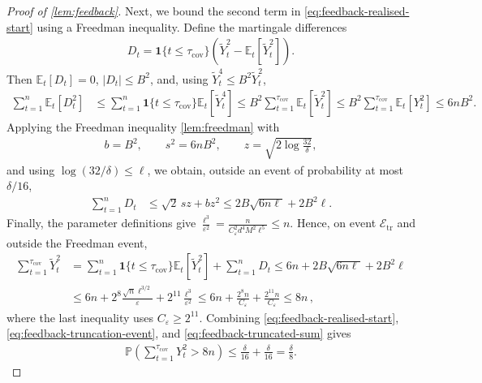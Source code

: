 \documentclass[11pt]{article}
\newcommand{\E}{\mathbb E}
\newcommand{\Pp}{\mathbb P}
\newcommand{\1}{\mathbf 1}
\newcommand{\eps}{\varepsilon}
\begin{document}
\begin{proof}[Proof of \cref{lem:feedback}]
    Next, we bound the second term in \eqref{eq:feedback-realised-start} using a Freedman inequality.
    Define the martingale differences
    \begin{align}
        D_t
        =
        \1\{t\leq\tau_{\mathrm{cov}}\}
        \left(
        \widetilde Y_t^2
        -
        \E_t[\widetilde Y_t^2]
        \right).
    \end{align}
    Then
    $\E_t[D_t]
        =0$,
    $|D_t|\leq B^2$,
    and, using $\widetilde Y_t^4\leq B^2\widetilde Y_t^2$,
    \begin{align}
        \sum_{t=1}^n\E_t[D_t^2]
         & \leq
        \sum_{t=1}^n
        \1\{t\leq\tau_{\mathrm{cov}}\}
        \E_t[\widetilde Y_t^4]
        \leq
        B^2
        \sum_{t=1}^{\tau_{\mathrm{cov}}}
        \E_t[\widetilde Y_t^2]
        \leq
        B^2
        \sum_{t=1}^{\tau_{\mathrm{cov}}}
        \E_t[Y_t^2]
        \leq
        6nB^2.
        \label{eq:feedback-freedman-variance}
    \end{align}
    Applying the Freedman inequality \cref{lem:freedman} with
    \begin{align}
        b=B^2,
        \qquad
        s^2=6nB^2,
        \qquad
        z=\sqrt{2\log\frac{32}{\delta}},
    \end{align}
    and using $\log(32/\delta)\leq\ell$, we obtain, outside an event of
    probability at most $\delta/16$,
    \begin{align}
        \sum_{t=1}^nD_t
         & \leq
        \sqrt2\,s z+bz^2
        \leq
        2B\sqrt{6n\ell}
        +
        2B^2\ell.
        \label{eq:feedback-freedman}
    \end{align}
    Finally, the parameter definitions give
    $\frac{\ell^3}{\eps^2}
        =
        \frac{
            n
        }{
            C_\eps^2d^4M^2\ell^5
        }
        \leq n$.
    Hence, on event $\mathcal E_{\mathrm{tr}}$ and outside the Freedman event,
    \begin{align}
        \sum_{t=1}^{\tau_{\mathrm{cov}}}
        \widetilde Y_t^2
         & =
        \sum_{t=1}^n
        \1\{t\leq\tau_{\mathrm{cov}}\}
        \E_t[\widetilde Y_t^2]
        +
        \sum_{t=1}^nD_t
        \leq
        6n
        +
        2B\sqrt{6n\ell}
        +
        2B^2\ell
        \\
         &
        \leq
        6n
        +
        2^8\frac{\sqrt n \ell^{3/2}}{\eps}
        +
        2^{11}\frac{\ell^3}{\eps^2}
        \leq
        6n
        +
        \frac{2^8n}{C_\eps}
        +
        \frac{2^{11}n}{C_\eps}
        \leq
        8n\,,
        \label{eq:feedback-truncated-sum}
    \end{align}
    where the last inequality uses $C_\eps\geq2^{11}$.
    Combining
    \eqref{eq:feedback-realised-start},
    \eqref{eq:feedback-truncation-event}, and
    \eqref{eq:feedback-truncated-sum} gives
    \begin{align}
        \Pp\left(
        \sum_{t=1}^{\tau_{\mathrm{cov}}}Y_t^2
        >8n
        \right)
        \leq
        \frac{\delta}{16}
        +
        \frac{\delta}{16}
        =
        \frac{\delta}{8}.
    \end{align}
\end{proof}
\end{document}
